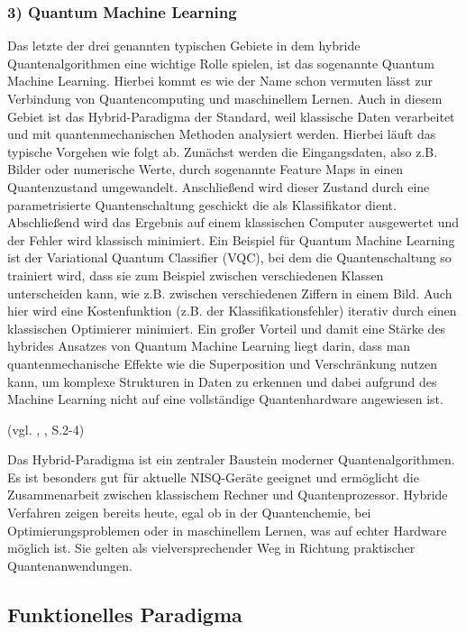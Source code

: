 \subsubsection*{3) Quantum Machine Learning}
Das letzte der drei genannten typischen Gebiete in dem hybride Quantenalgorithmen eine wichtige Rolle spielen, ist das sogenannte Quantum Machine Learning. Hierbei kommt es wie der Name schon vermuten lässt zur Verbindung von Quantencomputing und maschinellem Lernen. Auch in diesem Gebiet ist das Hybrid-Paradigma der Standard, weil klassische Daten verarbeitet und mit quantenmechanischen Methoden analysiert werden. 
Hierbei läuft das typische Vorgehen wie folgt ab. Zunächst werden die Eingangsdaten, also z.B. Bilder oder numerische Werte, durch sogenannte Feature Maps in einen Quantenzustand umgewandelt. Anschließend wird dieser Zustand durch eine parametrisierte Quantenschaltung geschickt die als Klassifikator dient. Abschließend wird das Ergebnis auf einem klassischen Computer ausgewertet und der Fehler wird klassisch minimiert. 
Ein Beispiel für Quantum Machine Learning ist der Variational Quantum Classifier (VQC), bei dem die Quantenschaltung so trainiert wird, dass sie zum Beispiel zwischen verschiedenen Klassen unterscheiden kann, wie z.B. zwischen verschiedenen Ziffern in einem Bild. Auch hier wird eine Kostenfunktion (z.B. der Klassifikationsfehler) iterativ durch einen klassischen Optimierer minimiert. 
Ein großer Vorteil und damit eine Stärke des hybrides Ansatzes von Quantum Machine Learning liegt darin, dass man quantenmechanische Effekte wie die Superposition und Verschränkung nutzen kann, um komplexe Strukturen in Daten zu erkennen und dabei aufgrund des Machine Learning nicht auf eine vollständige Quantenhardware angewiesen ist.

(vgl. \citeauthor{alchieri_introduction_2021}, \citeyear{alchieri_introduction_2021}, S.2-4)


Das Hybrid-Paradigma ist ein zentraler Baustein moderner Quantenalgorithmen. Es ist besonders gut für aktuelle NISQ-Geräte geeignet und ermöglicht die Zusammenarbeit zwischen klassischem Rechner und Quantenprozessor. Hybride Verfahren zeigen bereits heute, egal ob in der Quantenchemie, bei Optimierungsproblemen oder in maschinellem Lernen, was auf echter Hardware möglich ist. Sie gelten als vielversprechender Weg in Richtung praktischer Quantenanwendungen. 

\subsection{Funktionelles Paradigma}

